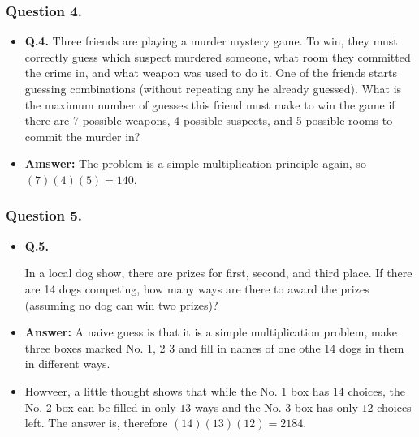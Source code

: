 %



\begin{frame}%
  \frametitle{Question 4.}
  \begin{itemize}%
 
\item {\bf Q.4.} Three friends are playing a murder mystery game.
To win, they must correctly guess which suspect murdered someone,
what room they committed the crime in, and what weapon was used to do it.
One of the friends starts guessing combinations (without repeating any he already guessed).
What is the maximum number of guesses this friend must make to win the game
if there are 7 possible weapons, 4 possible suspects, and 5 possible rooms to commit the murder in?

\item {\bf Amswer:}
The problem is a simple multiplication principle again, so
$(7)(4)(5)=140$.

\end{itemize}
\end{frame}

%



\begin{frame}%
  \frametitle{Question 5.}
  \begin{itemize}%

\item {\bf Q.5.}

In a local dog show, there are prizes for first, second, and third place.
If there are 14 dogs
competing, how many ways are there to award the prizes (assuming no dog can win two prizes)?

\item {\bf Answer:}
A naive guess is that it is a simple multiplication problem, make three
boxes marked No. 1, 2 3 and fill in names of one othe 14 dogs in them in
different ways.

\item
Howveer, a little thought shows that while the No. 1 box has $14$
choices, the No. 2 box can be filled in only $13$ ways and the No. 3 box
has only $12$ choices left. The answer is, therefore $(14)(13)(12)=
2184$.


\end{itemize}
\end{frame}

%


